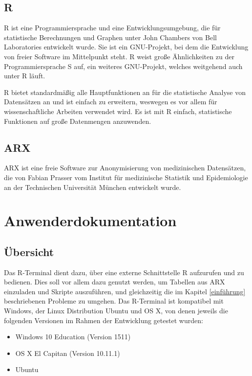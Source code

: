 \documentclass[a4paper, 12pt]{report} %
\begin{document}

\section*{R}\label{r}
R ist eine Programmiersprache und eine Entwicklungsumgebung, die für statistische Berechnungen und Graphen unter John Chambers von Bell Laboratories entwickelt wurde. Sie ist ein GNU-Projekt, bei dem die Entwicklung von freier Software im Mittelpunkt steht. R weist große Ähnlichkeiten zu der Programmiersprache S auf, ein weiteres GNU-Projekt, welches weitgehend auch unter R läuft. \cite{rproject}

R bietet standardmäßig alle Hauptfunktionen an für die statistische Analyse von Datensätzen an und ist einfach zu erweitern, weswegen es vor allem für wissenschaftliche Arbeiten verwendet wird. Es ist mit R einfach, statistische Funktionen auf große Datenmengen anzuwenden.  



\section*{ARX}
ARX ist eine freie Software zur Anonymisierung von medizinischen Datensätzen, die von Fabian Prasser vom Institut für medizinische Statistik und Epidemiologie an der Technischen Universität München entwickelt wurde. 


\chapter{Anwenderdokumentation}
\section{Übersicht}
Das R-Terminal dient dazu, über eine externe Schnittstelle R aufzurufen und zu bedienen. Dies soll vor allem dazu genutzt werden, um Tabellen aus ARX einzuladen und Skripte auszuführen, und gleichzeitig die im Kapitel \ref{einführung} beschriebenen Probleme zu umgehen. Das R-Terminal ist kompatibel mit Windows, der Linux Distribution Ubuntu und OS X, von denen jeweils die folgenden Versionen im Rahmen der Entwicklung getestet wurden: 

\begin{itemize}
\item Windows 10 Education (Version 1511)
\item OS X El Capitan (Version 10.11.1)
\item Ubuntu
\end{itemize}
\end{document}
